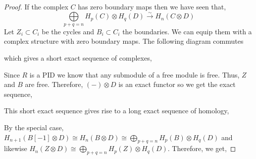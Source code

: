 \documentclass[12pt]{extarticle}
\theoremstyle{definition}
\begin{document}
\begin{proof}
If the complex $C$ has zero boundary maps then we have seen that,
\[ \bigoplus\limits_{p+q = n} H_p(C) \otimes H_q(D) \xrightarrow{\sim} H_n(C \otimes D) \]
Let $Z_i \subset C_i$ be the cycles and $B_i \subset C_i$ the boundaries. We can equip them with a complex structure with zero boundary maps. The following diagram commutes 
\begin{center}
\end{center}
which gives a short exact sequence of complexes,
\begin{center}
\end{center}
Since $R$ is a PID we know that any submodule of a free module is free. Thus, $Z$ and $B$ are free. Therefore, $(-) \otimes D$ is an exact functor so we get the exact sequence,
\begin{center}
\end{center}
This short exact sequence gives rise to a long exact sequence of homology,
\begin{center}
\end{center}
By the special case, $H_{n+1}(B[-1] \otimes D) \cong H_{n}(B \otimes D) \cong \bigoplus\limits_{p+q = n} H_{p}(B) \otimes H_{q}(D)$ and likewise $H_n(Z \otimes D) \cong \bigoplus\limits_{p+q = n} H_p(Z) \otimes H_q(D)$. Therefore, we get, 

\end{proof}
\end{document}
